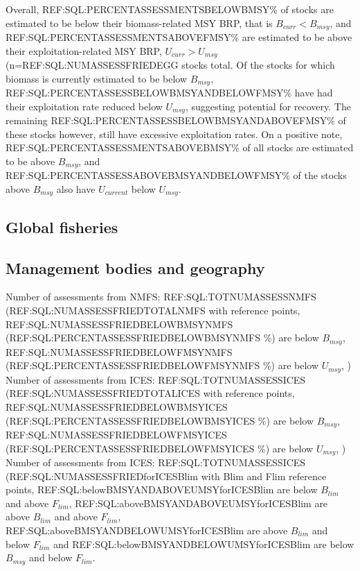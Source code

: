 Overall, REF:SQL:PERCENTASSESSMENTSBELOWBMSY\% of stocks are estimated
to be below their biomass-related MSY BRP, that is $B_{curr}<B_{msy}$,
and REF:SQL:PERCENTASSESSMENTSABOVEFMSY\% are estimated to be above
their exploitation-related MSY BRP, $U_{curr}>U_{msy}$
(n=REF:SQL:NUMASSESSFRIEDEGG stocks total.
Of the stocks for which biomass is currently estimated to be below
$B_{msy}$, REF:SQL:PERCENTASSESSBELOWBMSYANDBELOWFMSY\% have had their
exploitation rate reduced below $U_{msy}$, suggesting potential for
recovery. The remaining
REF:SQL:PERCENTASSESSBELOWBMSYANDABOVEFMSY\% of these stocks however,
still have excessive exploitation rates. On a positive note,
REF:SQL:PERCENTASSESSMENTSABOVEBMSY\% of all stocks are estimated to
be above $B_{msy}$, and REF:SQL:PERCENTASSESSABOVEBMSYANDBELOWFMSY\%
of the stocks above $B_{msy}$ also have $U_{current}$ below $U_{msy}$.


\subsection*{Global fisheries}

\subsection*{Management bodies and geography}
\noindent
Number of assessments from NMFS: REF:SQL:TOTNUMASSESSNMFS (REF:SQL:NUMASSESSFRIEDTOTALNMFS with reference points, REF:SQL:NUMASSESSFRIEDBELOWBMSYNMFS (REF:SQL:PERCENTASSESSFRIEDBELOWBMSYNMFS \%) are below $B_{msy}$, REF:SQL:NUMASSESSFRIEDBELOWFMSYNMFS (REF:SQL:PERCENTASSESSFRIEDBELOWFMSYNMFS \%) are below $U_{msy}$, ) \\

Number of assessments from ICES: REF:SQL:TOTNUMASSESSICES (REF:SQL:NUMASSESSFRIEDTOTALICES with reference points, REF:SQL:NUMASSESSFRIEDBELOWBMSYICES (REF:SQL:PERCENTASSESSFRIEDBELOWBMSYICES \%) are below $B_{msy}$, REF:SQL:NUMASSESSFRIEDBELOWFMSYICES (REF:SQL:PERCENTASSESSFRIEDBELOWFMSYICES \%) are below $U_{msy}$, ) \\

Number of assessments from ICES: REF:SQL:TOTNUMASSESSICES (REF:SQL:NUMASSESSFRIEDforICESBlim with Blim and Flim reference points, REF:SQL:belowBMSYANDABOVEUMSYforICESBlim are below $B_{lim}$ and above $F_{lim}$, REF:SQL:aboveBMSYANDABOVEUMSYforICESBlim are above $B_{lim}$ and above $F_{lim}$, REF:SQL:aboveBMSYANDBELOWUMSYforICESBlim are above $B_{lim}$ and below $F_{lim}$ and REF:SQL:belowBMSYANDBELOWUMSYforICESBlim are below $B_{msy}$ and below $F_{lim}$.

